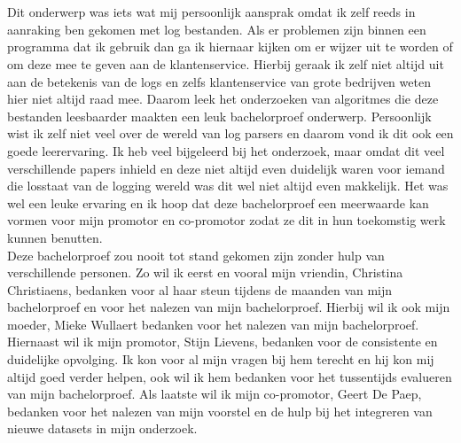 
\chapter*{}
\label{ch:voorwoord}


Dit onderwerp was iets wat mij persoonlijk aansprak omdat ik zelf reeds in aanraking ben gekomen met log bestanden. Als er problemen zijn binnen een programma dat ik gebruik dan ga ik hiernaar kijken om er wijzer uit te worden of om deze mee te geven aan de klantenservice. Hierbij geraak ik zelf niet altijd uit aan de betekenis van de logs en zelfs klantenservice van grote bedrijven weten hier niet altijd raad mee. Daarom leek het onderzoeken van algoritmes die deze bestanden leesbaarder maakten een leuk bachelorproef onderwerp. Persoonlijk wist ik zelf niet veel over de wereld van log parsers en daarom vond ik dit ook een goede leerervaring. Ik heb veel bijgeleerd bij het onderzoek, maar omdat dit veel verschillende papers inhield en deze niet altijd even duidelijk waren voor iemand die losstaat van de logging wereld was dit wel niet altijd even makkelijk. Het was wel een leuke ervaring en ik hoop dat deze bachelorproef een meerwaarde kan vormen voor mijn promotor en co-promotor zodat ze dit in hun toekomstig werk kunnen benutten.\\

Deze bachelorproef zou nooit tot stand gekomen zijn zonder hulp van verschillende personen. Zo wil ik eerst en vooral mijn vriendin, Christina Christiaens, bedanken voor al haar steun tijdens de maanden van mijn bachelorproef en voor het nalezen van mijn bachelorproef. Hierbij wil ik ook mijn moeder, Mieke Wullaert bedanken voor het nalezen van mijn bachelorproef. Hiernaast wil ik mijn promotor, Stijn Lievens, bedanken voor de consistente en duidelijke opvolging. Ik kon voor al mijn vragen bij hem terecht en hij kon mij altijd goed verder helpen, ook wil ik hem bedanken voor het tussentijds evalueren van mijn bachelorproef. Als laatste wil ik mijn co-promotor, Geert De Paep, bedanken voor het nalezen van mijn voorstel en de hulp bij het integreren van nieuwe datasets in mijn onderzoek.